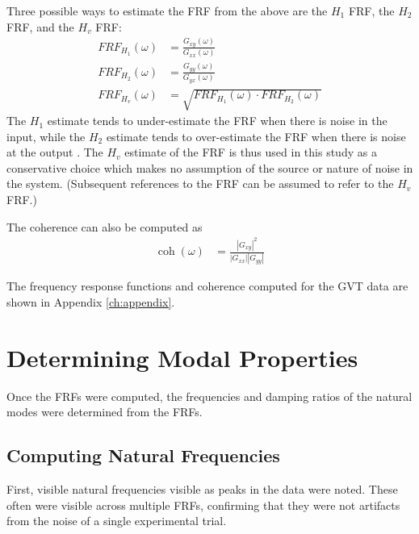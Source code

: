Three possible ways to estimate the FRF from the above are the $H_1$ FRF, the $H_2$ FRF, and the $H_v$ FRF:
\begin{align}
    FRF_{H_1}(\omega) &= \frac{G_{xy}(\omega)}{G_{xx}(\omega)} \\
    FRF_{H_2}(\omega) &= \frac{G_{yy}(\omega)}{G_{yx}(\omega)} \\
    \label{eq:frf}
    FRF_{H_v}(\omega) &= \sqrt{FRF_{H_1}(\omega) \cdot FRF_{H_2}(\omega)}
\end{align}
The $H_1$ estimate tends to under-estimate the FRF when there is noise in the input, while the $H_2$ estimate tends to over-estimate the FRF when there is noise at the output \cite{Tischler2012}. The $H_v$ estimate of the FRF is thus used in this study as a conservative choice which makes no assumption of the source or nature of noise in the system. (Subsequent references to the FRF can be assumed to refer to the $H_v$ FRF.)

The coherence can also be computed as
\begin{align}
    \operatorname{coh}(\omega) &= \frac{|G_{xy}|^2}{|G_{xx}||G_{yy}|}
\end{align}

The frequency response functions and coherence computed for the GVT data are shown in Appendix \ref{ch:appendix}.

\section{Determining Modal Properties} %

Once the FRFs were computed, the frequencies and damping ratios of the natural modes were determined from the FRFs.

\subsection{Computing Natural Frequencies}

First, visible natural frequencies visible as peaks in the data were noted. These often were visible across multiple FRFs, confirming that they were not artifacts from the noise of a single experimental trial.

